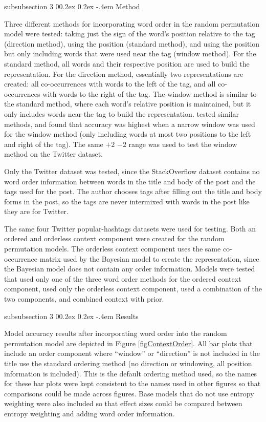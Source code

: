 \documentclass[man,floatsintext,donotrepeattitle]{apa6}
\makeatletter
\renewcommand{\subsubsection}{%
  \@startsection
  {subsubsection}%
  {3}%
  {\parindent}%
  {0\baselineskip \@plus 0.2ex \@minus 0.2ex}%
  {-.4em}%
  {\normalfont\normalsize\bfseries\addperi}}
\makeatother
\begin{document}
\subsubsection{Method}

Three different methods for incorporating word order in the random permutation model were tested:
taking just the sign of the word's position relative to the tag (direction method), using the position (standard method), and using the position but only including words that were used near the tag (window method).
For the standard method, all words and their respective position are used to build the representation.
For the direction method, essentially two representations are created: all co-occurrences with words to the left of the tag, and all co-occurrences with words to the right of the tag.
The window method is similar to the standard method, where each word's relative position is maintained, but it only includes words near the tag to build the representation.
\textcite{Sahlgren2008} tested similar methods, and found that accuracy was highest when a narrow window was used for the window method (only including words at most two positions to the left and right of the tag).
The same $+2$ $-2$ range was used to test the window method on the Twitter dataset.

Only the Twitter dataset was tested, since the StackOverflow dataset contains no word order information between words in the title and body of the post and the tags used for the post.
The author chooses tags after filling out the title and body forms in the post, so the tags are never intermixed with words in the post like they are for Twitter.

The same four Twitter popular-hashtags datasets were used for testing.
Both an ordered and orderless context component were created for the random permutation models.
The orderless context component uses the same co-occurrence matrix used by the Bayesian model to create the representation, since the Bayesian model does not contain any order information.
Models were tested that used only one of the three word order methods for the ordered context component, used only the orderless context component, used a combination of the two components, and combined context with prior. 

\subsubsection{Results}

Model accuracy results after incorporating word order into the random permutation model are depicted in Figure \ref{figContextOrder}.
All bar plots that include an order component where ``window'' or ``direction'' is not included in the title use the standard ordering method (no direction or windowing, all position information is included).
This is the default ordering method used, so the names for these bar plots were kept consistent to the names used in other figures so that comparisons could be made across figures.
Base models that do not use entropy weighting were also included so that effect sizes could be compared between entropy weighting and adding word order information.
\end{document}
